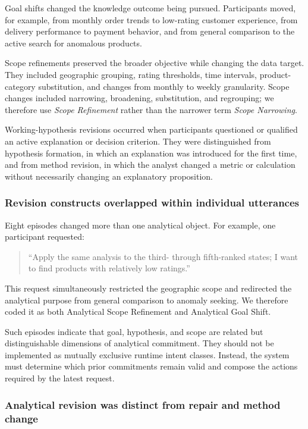 \documentclass[journal]{IEEEtran}
\begin{document}
Goal shifts changed the knowledge outcome being pursued. Participants moved,
for example, from monthly order trends to low-rating customer experience, from
delivery performance to payment behavior, and from general comparison to the
active search for anomalous products.

Scope refinements preserved the broader objective while changing the data
target. They included geographic grouping, rating thresholds, time intervals,
product-category substitution, and changes from monthly to weekly
granularity. Scope changes included narrowing, broadening, substitution, and
regrouping; we therefore use \emph{Scope Refinement} rather than the narrower
term \emph{Scope Narrowing}.

Working-hypothesis revisions occurred when participants questioned or
qualified an active explanation or decision criterion. They were distinguished
from hypothesis formation, in which an explanation was introduced for the
first time, and from method revision, in which the analyst changed a metric or
calculation without necessarily changing an explanatory proposition.

\subsubsection{Revision constructs overlapped within individual utterances}

Eight episodes changed more than one analytical object. For example, one
participant requested:

\begin{quote}
``Apply the same analysis to the third- through fifth-ranked states; I want to
find products with relatively low ratings.''
\end{quote}

This request simultaneously restricted the geographic scope and redirected the
analytical purpose from general comparison to anomaly seeking. We therefore
coded it as both Analytical Scope Refinement and Analytical Goal Shift.

Such episodes indicate that goal, hypothesis, and scope are related but
distinguishable dimensions of analytical commitment. They should not be
implemented as mutually exclusive runtime intent classes. Instead, the system
must determine which prior commitments remain valid and compose the actions
required by the latest request.

\subsubsection{Analytical revision was distinct from repair and method change}
\end{document}
